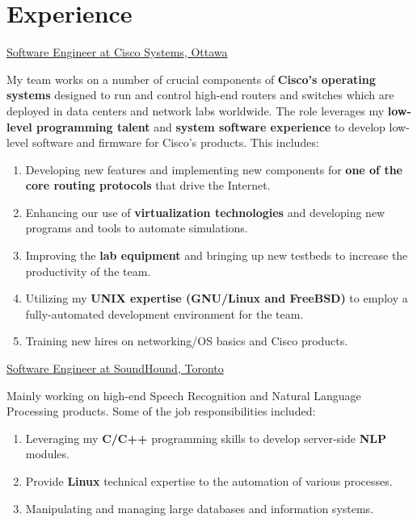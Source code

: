 \documentclass[letterpaper]{twentysecondcv} %
\begin{document}

\section{Experience}

\begin{twenty}

           {\underline{Software Engineer at \textcolor{OliveGreen}{Cisco Systems}, Ottawa}}
           {}
           {My team works on a number of crucial components of \textbf{Cisco's operating systems} designed to run and
            control high-end routers and switches which are deployed in data centers and network labs worldwide.
            The role leverages my \textbf{low-level programming talent} and \textbf{system software experience} to develop
            low-level software and firmware for Cisco's products. This includes:
           \begin{enumerate}
               \item{Developing new features and implementing new components for \textbf{one of the core routing protocols} that drive the Internet.}
               \item{Enhancing our use of \textbf{virtualization technologies} and developing new programs and tools to automate simulations.}
               \item{Improving the \textbf{lab equipment} and bringing up new testbeds to increase the productivity of the team.}
               \item{Utilizing my \textbf{UNIX expertise (GNU/Linux and FreeBSD)} to employ a fully-automated development environment for the team.}
               \item{Training new hires on networking/OS basics and Cisco products.}
           \end{enumerate}
           }

             {\underline{Software Engineer at \textcolor{OliveGreen}{SoundHound}, Toronto}}
             {}
             {Mainly working on high-end Speech Recognition and Natural Language Processing products. Some of the job responsibilities included:
             \begin{enumerate}
                 \item{Leveraging my \textbf{C/C++} programming skills to develop server-side \textbf{NLP} modules.}
                 \item{Provide \textbf{Linux} technical expertise to the automation of various processes.}
                 \item{Manipulating and managing large databases and information systems.}
             \end{enumerate}
             }


\end{twenty}
\end{document}
